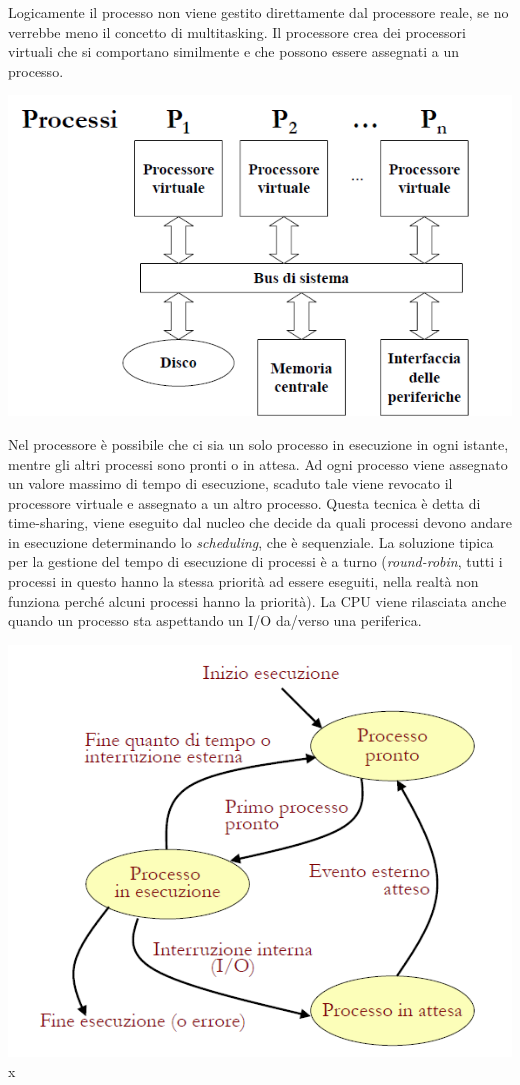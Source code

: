 \documentclass[
  paper=a4,
  oneside  ,captions=tableheading
]{scrbook}
\begin{document}
Logicamente il processo non viene gestito direttamente dal processore
reale, se no verrebbe meno il concetto di multitasking. Il processore
crea dei processori virtuali che si comportano similmente e che possono
essere assegnati a un processo.

\includegraphics{./image/image-20201123234616173.png}

Nel processore è possibile che ci sia un solo processo in esecuzione in
ogni istante, mentre gli altri processi sono pronti o in attesa. Ad ogni
processo viene assegnato un valore massimo di tempo di esecuzione,
scaduto tale viene revocato il processore virtuale e assegnato a un
altro processo. Questa tecnica è detta di time-sharing, viene eseguito
dal nucleo che decide da quali processi devono andare in esecuzione
determinando lo \emph{scheduling}, che è sequenziale. La soluzione
tipica per la gestione del tempo di esecuzione di processi è a turno
(\emph{round-robin}, tutti i processi in questo hanno la stessa priorità
ad essere eseguiti, nella realtà non funziona perché alcuni processi
hanno la priorità). La CPU viene rilasciata anche quando un processo sta
aspettando un I/O da/verso una periferica.

\includegraphics{./image/image-20201123235406308.png}x
\end{document}
